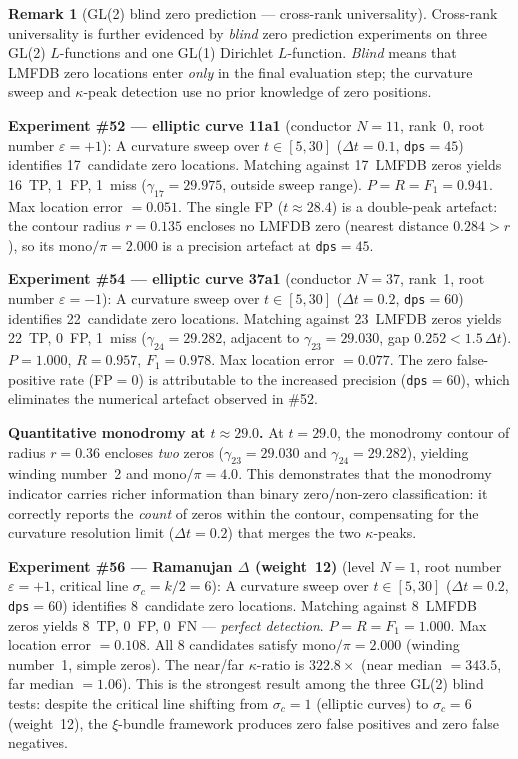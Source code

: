 \documentclass[11pt, a4paper]{article}
\theoremstyle{definition}
\newtheorem{remark}{Remark}[section]
\theoremstyle{plain}
\begin{document}
\begin{remark}[GL(2) blind zero prediction --- cross-rank universality]
\label{rem:gl2_blind_prediction}
Cross-rank universality is further evidenced by \emph{blind} zero
prediction experiments on three GL(2) $L$-functions and one GL(1)
Dirichlet $L$-function.
\emph{Blind} means that LMFDB zero locations enter \emph{only} in the
final evaluation step; the curvature sweep and $\kappa$-peak detection
use no prior knowledge of zero positions.

\textbf{Experiment \#52 --- elliptic curve 11a1}
(conductor $N=11$, rank~0, root number $\varepsilon=+1$):
A curvature sweep over $t\in[5,30]$ ($\Delta t = 0.1$, \texttt{dps}$=45$)
identifies 17~candidate zero locations.  Matching against 17~LMFDB zeros
yields 16~TP, 1~FP, 1~miss ($\gamma_{17}=29.975$, outside sweep range).
$P = R = F_1 = 0.941$.  Max location error $= 0.051$.
The single FP ($t\approx 28.4$) is a double-peak artefact: the contour
radius $r = 0.135$ encloses no LMFDB zero (nearest distance $0.284>r$),
so its mono$/\pi = 2.000$ is a precision artefact at \texttt{dps}$=45$.

\textbf{Experiment \#54 --- elliptic curve 37a1}
(conductor $N=37$, rank~1, root number $\varepsilon=-1$):
A curvature sweep over $t\in[5,30]$ ($\Delta t = 0.2$, \texttt{dps}$=60$)
identifies 22~candidate zero locations.  Matching against 23~LMFDB zeros
yields 22~TP, 0~FP, 1~miss ($\gamma_{24}=29.282$, adjacent to $\gamma_{23}=29.030$,
gap $0.252 < 1.5\,\Delta t$).
$P = 1.000$, $R = 0.957$, $F_1 = 0.978$.  Max location error $= 0.077$.
The zero false-positive rate (FP$=0$) is attributable to the increased precision
(\texttt{dps}$=60$), which eliminates the numerical artefact observed in \#52.

\textbf{Quantitative monodromy at $t\approx 29.0$.}
At $t = 29.0$, the monodromy contour of radius $r = 0.36$ encloses
\emph{two} zeros ($\gamma_{23}=29.030$ and $\gamma_{24}=29.282$),
yielding winding number~2 and mono$/\pi = 4.0$.
This demonstrates that the monodromy indicator carries richer information
than binary zero/non-zero classification: it correctly reports the
\emph{count} of zeros within the contour, compensating for the curvature
resolution limit ($\Delta t = 0.2$) that merges the two $\kappa$-peaks.

\textbf{Experiment \#56 --- Ramanujan $\Delta$ (weight~12)}
(level $N=1$, root number $\varepsilon=+1$, critical line $\sigma_c = k/2 = 6$):
A curvature sweep over $t\in[5,30]$ ($\Delta t = 0.2$, \texttt{dps}$=60$)
identifies 8~candidate zero locations.  Matching against 8~LMFDB zeros
yields 8~TP, 0~FP, 0~FN --- \emph{perfect detection}.
$P = R = F_1 = 1.000$.  Max location error $= 0.108$.
All 8 candidates satisfy mono$/\pi = 2.000$ (winding number~1, simple zeros).
The near/far $\kappa$-ratio is $322.8\times$ (near median $= 343.5$,
far median $= 1.06$).
This is the strongest result among the three GL(2) blind tests:
despite the critical line shifting from $\sigma_c = 1$ (elliptic curves)
to $\sigma_c = 6$ (weight~12), the $\xi$-bundle framework
produces zero false positives and zero false negatives.


\end{remark}
\end{document}
